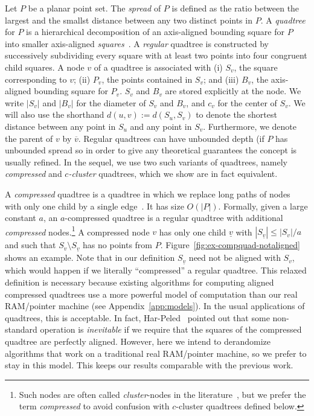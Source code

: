 \documentclass[11pt]{paper}
\newcommand {\eqdef} {:=}
\newcommand {\parent} {\overline}
\newcommand {\child} {\underline}
\begin{document}
    Let $P$ be a planar point set.
    The \emph{spread} of $P$ is defined as the
    ratio between the largest and the smallst distance between
    any two distinct points in $P$.
    A \emph{quad\-tree} for $P$ is a hi\-erarchical
    decomposition of an axis-aligned bounding square for $P$ into smaller
    axis-aligned
    \emph{squares}~\cite{deBergChvKrOv08,FinkelBe74,HarPeled11,Samet90}.
    A \emph{regular} quadtree is constructed by
    successively subdividing every square with at least two points
    into four congruent child squares. A node $v$ of a quadtree
    is associated with
    (i) $S_v$, the square corresponding to $v$;
    (ii) $P_v$, the points contained in $S_v$; 
    and (iii) $B_v$, the axis-aligned bounding square for
    $P_v$.
    $S_v$ and $B_v$ are stored explicitly at the node.
    We write $|S_v|$ and $|B_v|$  for the diameter of
    $S_v$ and $B_v$, and $c_v$ for the center of $S_v$.
    We will also use the shorthand $d(u,v) \eqdef d(S_u, S_v)$
    to denote the shortest distance between any point in $S_u$ and
    any point in $S_v$.
    Furthermore, we denote the parent of $v$ by $\parent v$.
    Regular quadtrees can have unbounded depth (if $P$ has unbounded 
    spread
    so in order to give any theoretical guarantees the concept is
    usually refined.
    In the sequel, we use two such variants of quadtrees, namely
    \emph{compressed} and \emph{$c$-cluster} quadtrees,
    which we show are in fact equivalent.

    A \emph {compressed} quadtree is a quadtree in which we replace
    long paths of nodes with only one child by a single 
    edge~\cite{BernEpGi94,BernEpTe99,BuchinLoMoMuXX,Clarkson83}.
    It has size $O (|P|)$.  Formally,
    given a large constant $a$, an $a$-compressed quadtree
    is a regular quadtree with additional \emph{compressed} nodes.\footnote
    {Such nodes are often called \emph {cluster}-nodes in the
    literature~\cite{BernEpGi94,BernEpTe99,BuchinLoMoMuXX},
    but we prefer the term \emph {compressed} to avoid confusion with
    $c$-cluster quadtrees defined below.}
    A compressed
    node $v$ has only one child $\child v$ with
    $|S_{\child v}| \leq |S_v|/a$ and such that $S_v \setminus S_{\child v}$
    has no points from $P$. 
    Figure~\ref {fig:ex-compquad-notaligned} shows an example.
     Note that in our definition
    $S_{\child v}$ need not be aligned with $S_v$, which would
    happen if we literally ``compressed'' a regular quadtree.
    This relaxed definition is necessary because existing algorithms for 
    computing
    aligned compressed quadtrees use a more powerful model of
    computation than our real RAM/pointer machine
    (see Appendix~\ref{app:models}).  In the usual applications of quadtrees,
    this is acceptable. In fact, Har-Peled~\cite[Chapter~2]{HarPeled11}
    pointed out that some non-standard operation is
    \emph{inevitable} if we require that the squares of the compressed quadtree
    are perfectly aligned. However, here we intend to derandomize algorithms
    that work on a traditional real RAM/pointer machine, so we
    prefer to stay in this model. This keeps our results comparable with the
    previous work.
    
\end{document}
